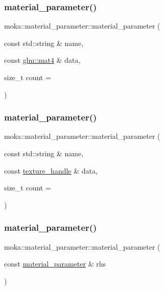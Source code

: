 \subsubsection{\texorpdfstring{material\_parameter()}{material\_parameter()}\hspace{0.1cm}{\footnotesize\ttfamily [17/20]}}
{\footnotesize\ttfamily moka\+::material\+\_\+parameter\+::material\+\_\+parameter (\begin{DoxyParamCaption}\item[{const std\+::string \&}]{name,  }\item[{const \mbox{\hyperlink{namespacemoka_aed2224bc0e5b79e57a8975ded94ee1aaabe14b41eb96410ea28b32bc138d885ae}{glm\+::mat4}} \&}]{data,  }\item[{size\+\_\+t}]{count = {} }\end{DoxyParamCaption})}

\mbox{\label{structmoka_1_1material__parameter_ad03ba37beeaabe3695f3db4cdd4219f5}} 
\subsubsection{\texorpdfstring{material\_parameter()}{material\_parameter()}\hspace{0.1cm}{\footnotesize\ttfamily [18/20]}}
{\footnotesize\ttfamily moka\+::material\+\_\+parameter\+::material\+\_\+parameter (\begin{DoxyParamCaption}\item[{const std\+::string \&}]{name,  }\item[{const \mbox{\hyperlink{structmoka_1_1texture__handle}{texture\+\_\+handle}} \&}]{data,  }\item[{size\+\_\+t}]{count = {} }\end{DoxyParamCaption})}

\mbox{\label{structmoka_1_1material__parameter_aefdabb59fb40999a1b5ec5d4eadec126}} 
\subsubsection{\texorpdfstring{material\_parameter()}{material\_parameter()}\hspace{0.1cm}{\footnotesize\ttfamily [19/20]}}
{\footnotesize\ttfamily moka\+::material\+\_\+parameter\+::material\+\_\+parameter (\begin{DoxyParamCaption}\item[{const \mbox{\hyperlink{structmoka_1_1material__parameter}{material\+\_\+parameter}} \&}]{rhs }\end{DoxyParamCaption})\hspace{0.3cm}{\ttfamily [default]}}

